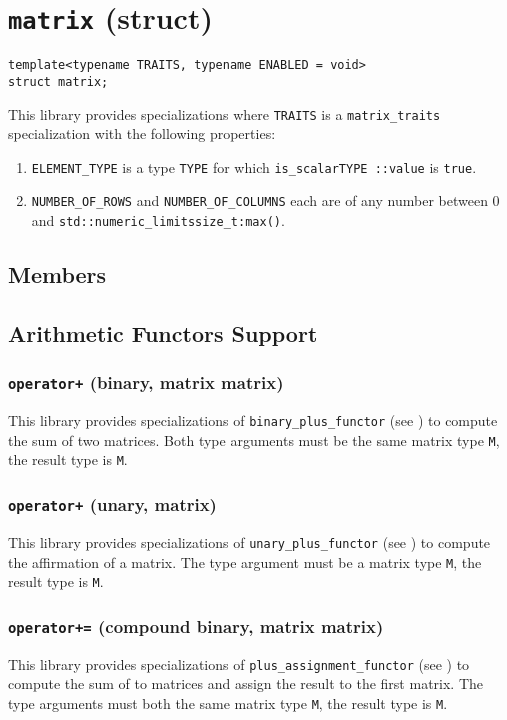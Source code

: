 \documentclass[oneside]{book}
\begin{document}
\section{\texttt{matrix} (struct)}
\begin{verbatim}
template<typename TRAITS, typename ENABLED = void>
struct matrix;
\end{verbatim}
\noindent{}This library provides specializations where \texttt{TRAITS} is a \texttt{matrix\_traits}
specialization with the following properties:
\begin{enumerate}
	\item \texttt{ELEMENT\_TYPE} is a type \texttt{TYPE} for which \texttt{is\_scalar\textlangle TYPE \textrangle::value} is \texttt{true}.
	\item \texttt{NUMBER\_OF\_ROWS} and \texttt{NUMBER\_OF\_COLUMNS} each are of any number between 0 and
	\texttt{std::numeric\_limits\textlangle size\_t\textrangle\::max()}.
\end{enumerate}

\subsection{Members}

\subsection{Arithmetic Functors Support}

\subsubsection{\texttt{operator+} (binary, matrix matrix)}
This library provides specializations of
\texttt{binary\_plus\_functor}
(see \cite{arithmeticfunctors}) to compute the
sum
of two matrices. Both type arguments must be the same matrix type \texttt{M}, the result type is \texttt{M}.

\subsubsection{\texttt{operator+} (unary, matrix)}
This library provides specializations of
\texttt{unary\_plus\_functor}
(see \cite{arithmeticfunctors}) to compute
the affirmation
of a matrix.
The type argument must be a matrix type \texttt{M}, the result type is \texttt{M}.

\subsubsection{\texttt{operator+=} (compound binary, matrix matrix)}
This library provides specializations of
\texttt{plus\_assignment\_functor}
(see \cite{arithmeticfunctors}) to compute
the sum of to matrices and assign the result to the first matrix.
The type arguments must both the same matrix type \texttt{M}, the result type is \texttt{M}.
\end{document}
